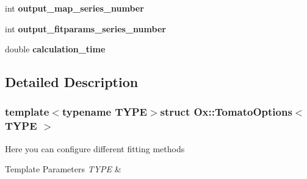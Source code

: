 \begin{DoxyCompactItemize}
\item 
\hypertarget{struct_ox_1_1_tomato_options_ab20a779c5a8dd371ec9356e3f9ce79c9}{int {\bfseries output\-\_\-map\-\_\-series\-\_\-number}}\label{struct_ox_1_1_tomato_options_ab20a779c5a8dd371ec9356e3f9ce79c9}

\item 
\hypertarget{struct_ox_1_1_tomato_options_a58664e816cde6eff746bd5abe4fe2d1c}{int {\bfseries output\-\_\-fitparams\-\_\-series\-\_\-number}}\label{struct_ox_1_1_tomato_options_a58664e816cde6eff746bd5abe4fe2d1c}

\item 
\hypertarget{struct_ox_1_1_tomato_options_a008c932c7d65248d2d82e0e654993384}{double {\bfseries calculation\-\_\-time}}\label{struct_ox_1_1_tomato_options_a008c932c7d65248d2d82e0e654993384}

\end{DoxyCompactItemize}


\subsection{Detailed Description}
\subsubsection*{template$<$typename T\-Y\-P\-E$>$struct Ox\-::\-Tomato\-Options$<$ T\-Y\-P\-E $>$}

Here you can configure different fitting methods 
\begin{DoxyTemplParams}{Template Parameters}
{\em T\-Y\-P\-E} & \\
\hline
\end{DoxyTemplParams}


